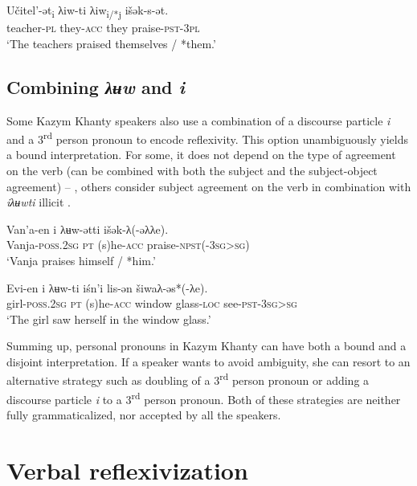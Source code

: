 \documentclass[output=paper]{langscibook}
\begin{document}
	\ex
	\label{ex:Volkova:42b}
  	 \gll Učitel’-ət\textsubscript{i} λiw-ti λiw\textsubscript{i/*j} išək-s-ət. \\
  	 teacher-\textsc{pl} they-\textsc{acc} they praise-\textsc{pst-3pl}\\
  	 \glt ‘The teachers praised themselves / *them.’
	\z
\z


\subsection{{Combining} {\textit{λʉw} }{and} {\textit{i}}}\label{sec:Volkova:4.2}

Some Kazym Khanty speakers also use a combination of a discourse particle \textit{i} and a 3\textsuperscript{rd} person pronoun to encode reflexivity. This option unambiguously yields a bound interpretation. For some, it does not depend on the type of agreement on the verb (can be combined with both the subject and the subject-object agreement) – , others consider subject agreement on the verb in combination with \textit{iλʉwti} illicit . 

\ea 
\label{ex:Volkova:43}
  \gll Van’a-en i λʉw-ətti išək-λ(-əλλe). \\
 Vanja\textsc{{}-poss.2sg} \textsc{pt} (s)he\textsc{{}-acc} praise-\textsc{npst(-3sg>sg)} \\
  \glt ‘Vanja praises himself / *him.’
\z

\ea 
\label{ex:Volkova:44}
  \gll Evi-en i λʉw-ti iśn’i lis-ən šiwaλ-əs*(-λe). \\
 girl\textsc{{}-poss.2sg} \textsc{pt} (s)he\textsc{{}-acc} window glass\textsc{{}-loc} see\textsc{{}-pst-3sg>sg}\\
  \glt ‘The girl saw herself in the window glass.’
\z



Summing up, personal pronouns in Kazym Khanty can have both a bound and a disjoint interpretation. If a speaker wants to avoid ambiguity, she can resort to an alternative strategy such as doubling of a 3\textsuperscript{rd} person pronoun or adding a discourse particle \textit{i} to a 3\textsuperscript{rd} person pronoun. Both of these strategies are neither fully grammaticalized, nor accepted by all the speakers.

\section{{Verbal} {reflexivization}}\label{sec:Volkova:5}
\end{document}
